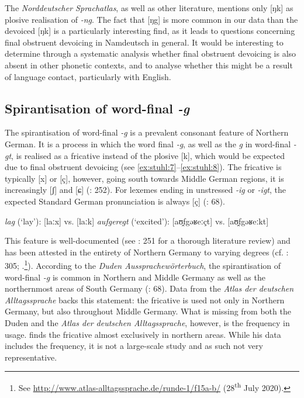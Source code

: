 \documentclass[output=paper]{langsci/langscibook}
\begin{document}
The \textit{Norddeutscher Sprachatlas}, as well as other literature, mentions only [ŋk] as plosive realisation of \textit{-ng}. The fact that [ŋg] is more common in our data than the devoiced [ŋk] is a particularly interesting find, as it leads to questions concerning final obstruent devoicing in Namdeutsch in general. It would be interesting to determine through a systematic analysis whether final obstruent devoicing is also absent in other phonetic contexts, and to analyse whether this might be a result of language contact, particularly with English. 

\subsection{Spirantisation of word-final \textit{-g}}
\label{sec:stuhl:4.4}

The spirantisation of word-final \textit{-g} is a prevalent consonant feature of Northern German. It is a process in which the word final \textit{-g}, as well as the \textit{g} in word-final \textit{-gt}, is realised as a fricative instead of the plosive [k], which would be expected due to final obstruent devoicing (see \ref{ex:stuhl:7}--\ref{ex:stuhl:8}). The fricative is typically [x] or [ç], however, going south towards Middle German regions, it is increasingly [ʃ] and [ɕ] (\citealt{elmentaler_norddeutscher_2015}: 252). For lexemes ending in unstressed \textit{-ig} or \textit{-igt}, the expected Standard German pronunciation is always [ç] (\citealt{kleiner_duden_2015}: 68). 

 
\ea\label{ex:stuhl:7}   
\textit{lag} (‘lay’): {[laːx]} vs. {[laːk]}
 \ex\label{ex:stuhl:8} 
{\textit{aufgeregt}} (‘excited’): {[aʊ̯⁠fgəʁeːçt]} vs. {[aʊ̯⁠fgəʁeːkt]}
\z
 
 

This feature is well-documented (see \citealt{elmentaler_norddeutscher_2015}: 251 for a thorough literature review) and has been attested in the entirety of Northern Germany to varying degrees (cf. \citealt{konig_atlas_2019b}: 305; \citealt{elspas_atlas_2003}.\footnote{See \url{http://www.atlas-alltagssprache.de/runde-1/f15a-b/} (28\textsuperscript{th} July 2020).}). According to the \textit{Duden Aussprachewörterbuch}, the spirantisation of word-final \textit{-g} is common in Northern and Middle Germany as well as the northernmost areas of South Germany (\citealt{kleiner_duden_2015}: 68). Data from the \textit{Atlas der deutschen Alltagssprache} backs this statement: the fricative is used not only in Northern Germany, but also throughout Middle Germany. What is missing from both the Duden and the \textit{Atlas der deutschen Alltagssprache}, however, is the frequency in usage. \citet[303ff]{konig_atlas_2019b} finds the fricative almost exclusively in northern areas. While his data includes the frequency, it is not a large-scale study and as such not very representative. 
\end{document}
